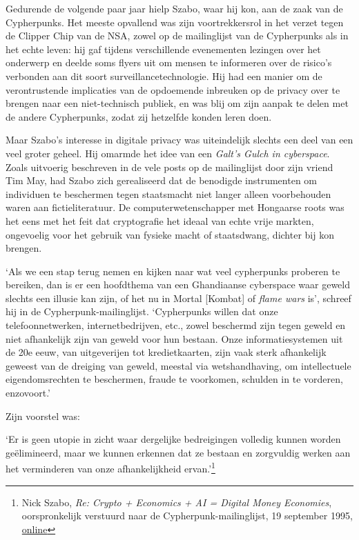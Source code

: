 \documentclass[
  a5paper,
  smalldemyvopaper,11pt,twoside,onecolumn,openright,extrafontsizes,
hidelinks]{memoir}
\renewenvironment{quote}%
               {\list{}{\rightmargin=.3cm\leftmargin=.3cm}%
                \itshape \item[]}%
               {\endlist}
\begin{document}
Gedurende de volgende paar jaar hielp Szabo, waar hij kon, aan de zaak
van de Cypherpunks. Het meeste opvallend was zijn voortrekkersrol in het
verzet tegen de Clipper Chip van de NSA, zowel op de mailinglijst van de
Cypherpunks als in het echte leven: hij gaf tijdens verschillende
evenementen lezingen over het onderwerp en deelde soms flyers uit om
mensen te informeren over de risico's verbonden aan dit soort
surveillancetechnologie. Hij had een manier om de verontrustende
implicaties van de opdoemende inbreuken op de privacy over te brengen
naar een niet-technisch publiek, en was blij om zijn aanpak te delen met
de andere Cypherpunks, zodat zij hetzelfde konden leren doen.

Maar Szabo's interesse in digitale privacy was uiteindelijk slechts een
deel van een veel groter geheel. Hij omarmde het idee van een
\emph{Galt's Gulch in cyberspace}. Zoals uitvoerig beschreven in de vele
posts op de mailinglijst door zijn vriend Tim May, had Szabo zich
gerealiseerd dat de benodigde instrumenten om individuen te beschermen
tegen staatsmacht niet langer alleen voorbehouden waren aan
fictieliteratuur. De computerwetenschapper met Hongaarse roots was het
eens met het feit dat cryptografie het ideaal van echte vrije markten,
ongevoelig voor het gebruik van fysieke macht of staatsdwang, dichter
bij kon brengen.

`Als we een stap terug nemen en kijken naar wat veel cypherpunks
proberen te bereiken, dan is er een hoofdthema van een Ghandiaanse
cyberspace waar geweld slechts een illusie kan zijn, of het nu in Mortal
{[}Kombat{]} of \emph{flame wars} is', schreef hij in de
Cypherpunk-mailinglijst. `Cypherpunks willen dat onze telefoonnetwerken,
internetbedrijven, etc., zowel beschermd zijn tegen geweld en niet
afhankelijk zijn van geweld voor hun bestaan. Onze informatiesystemen
uit de 20e eeuw, van uitgeverijen tot kredietkaarten, zijn vaak sterk
afhankelijk geweest van de dreiging van geweld, meestal via
wetshandhaving, om intellectuele eigendomsrechten te beschermen, fraude
te voorkomen, schulden in te vorderen, enzovoort.'

Zijn voorstel was:

\begin{quote}
`Er is geen utopie in zicht waar dergelijke bedreigingen volledig kunnen
worden geëlimineerd, maar we kunnen erkennen dat ze bestaan en
zorgvuldig werken aan het verminderen van onze afhankelijkheid
ervan.'\footnote{Nick Szabo, \emph{Re: Crypto + Economics + AI = Digital
  Money Economies}, oorspronkelijk verstuurd naar de
  Cypherpunk-mailinglijst, 19 september 1995,
  \href{https://cypherpunks.venona.com/date/1995/09/msg01303.html}{online}}
\end{quote}
\end{document}
